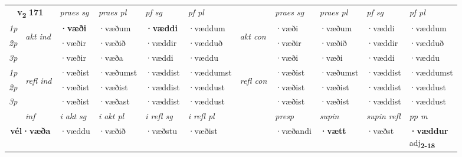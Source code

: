 \noindent
\begin{tabular}{lllllllllll} \toprule
\multicolumn{2}{c}{\textbf{v{\textsubscript{2}}} \Large{\textbf{171}}}  &  \textit{praes sg}  & \textit{praes pl}  &\textit{ pf sg} & \textit{pf pl} &  &  \textit{praes sg}  & \textit{praes pl}  & \textit{pf sg} & \textit{pf pl } \\*
	\cmidrule{3-6} \cmidrule{8-11}
 {\textit{1p}} & \multirow{3}{*}{\begin{turn}{90}\textit{akt ind}\end{turn}} & \textbf{·væði} & ·væðum & \textbf{·væddi} & ·væddum & \multirow{3}{*}{\begin{turn}{90}\textit{akt con}\end{turn}} &·væði & ·væðum & ·væddi & ·væddum\\*
 {\textit{2p}} &  &  ·væðir  & ·væðið & ·væddir & ·vædduð & & ·væðir & ·væðið & ·væddir & ·vædduð \\*
{\textit{3p}} &  & ·væðir & ·væða & ·væddi & ·væddu & & ·væði & ·væði& ·væddi & ·væddu \\*
\cmidrule{3-6} \cmidrule{8-11}
 {\textit{1p}} & \multirow{3}{*}{\begin{turn}{90}\textit{refl ind}\end{turn}}  & ·væðist & ·væðumst & ·væddist & ·væddumst & \multirow{3}{*}{\begin{turn}{90}\textit{refl con}\end{turn}}  &·væðist & ·væðumst & ·væddist & ·væddumst \\*
 {\textit{2p}} &  & ·væðist & ·væðist & ·væddist & ·væddust & &·væðist & ·væðist & ·væddist & ·væddust \\*
 {\textit{3p}}  & & ·væðist & ·væðast & ·væddist & ·væddust & & ·væðist & ·væðist& ·væddist & ·væddust \\*
\cmidrule{3-6} \cmidrule{8-11}

   \multicolumn{2}{c}{\textit{inf}}  & \textit{i akt sg} & \textit{i akt pl} & \textit{i refl sg} & \textit{i refl pl} && \textit{presp} & \textit{supin} & \textit{supin refl} & \textit{pp m} \\*
  \multicolumn{2}{c}{\textbf{vél\allowbreak ·væða}} & ·væddu  & ·væðið & ·væðstu & ·væðist && ·væðandi &  \textbf{·vætt} & ·væðst & \specialcell{\textbf{·væddur} \\ adj\textbf{\textsubscript{2-18}}} \\*
\end{tabular}

